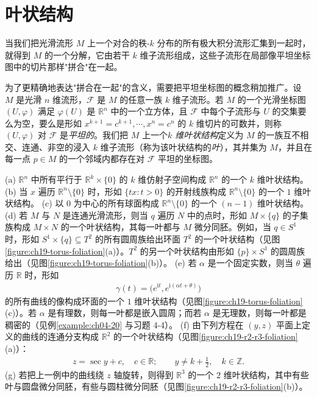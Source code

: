 \documentclass[../../main.tex]{subfiles}
\begin{document}
\section{叶状结构}\label{section:ch19-foliations}

当我们把光滑流形 $M$ 上一个对合的秩-$k$ 分布的所有极大积分流形汇集到一起时，就得到 $M$ 的一个分解，它由若干 $k$ 维子流形组成，这些子流形在局部像平坦坐标图中的切片那样"拼合"在一起。

为了更精确地表达"拼合在一起"的含义，需要把平坦坐标图的概念稍加推广。设 $M$ 是光滑 $n$ 维流形，$\mathscr F$ 是 $M$ 的任意一族 $k$ 维子流形。若 $M$ 的一个光滑坐标图 $(U,\varphi)$ 满足 $\varphi(U)$ 是 $\mathbb{R}^n$ 中的一个立方体，且 $\mathscr F$ 中每个子流形与 $U$ 的交集要么为空，要么是形如 $x^{k+1}=c^{k+1},\cdots ,x^n=c^n$ 的 $k$ 维切片的可数并，则称 $(U,\varphi)$ 对 $\mathscr F$ 是\emph{平坦的}。我们把 $M$ 上一个\emph{$k$ 维叶状结构}定义为 $M$ 的一族互不相交、连通、非空的浸入 $k$ 维子流形（称为该叶状结构的\emph{叶}），其并集为 $M$，并且在每一点 $p\in M$ 的一个邻域内都存在对 $\mathscr F$ 平坦的坐标图。

\begin{example}[叶状结构]\label{example:ch19-foliations}
(a) $\mathbb{R}^n$ 中所有平行于 $\mathbb{R}^k\times\{0\}$ 的 $k$ 维仿射子空间构成 $\mathbb{R}^n$ 的一个 $k$ 维叶状结构。
(b) 当 $x$ 遍历 $\mathbb{R}^n\setminus\{0\}$ 时，形如 $\{tx\colon t>0\}$ 的开射线族构成 $\mathbb{R}^n\setminus\{0\}$ 的一个 $1$ 维叶状结构。
(c) 以 $0$ 为中心的所有球面构成 $\mathbb{R}^n\setminus\{0\}$ 的一个 $(n-1)$ 维叶状结构。
(d) 若 $M$ 与 $N$ 是连通光滑流形，则当 $q$ 遍历 $N$ 中的点时，形如 $M\times\{q\}$ 的子集族构成 $M\times N$ 的一个叶状结构，其每一叶都与 $M$ 微分同胚。例如，当 $q\in S^1$ 时，形如 $S^1\times\{q\}\subseteq T^2$ 的所有圆周族给出环面 $T^2$ 的一个叶状结构（见图\cref{figure:ch19-torus-foliation}(a)）。$T^2$ 的另一个叶状结构由形如 $\{p\}\times S^1$ 的圆周族给出（见图\cref{figure:ch19-torus-foliation}(b)）。
(e) 若 $\alpha$ 是一个固定实数，则当 $\theta$ 遍历 $\mathbb{R}$ 时，形如
\begin{align*}
\gamma(t)=\bigl(e^{\mathrm{i}t},e^{\mathrm{i}(\alpha t+\theta)}\bigr)
\end{align*}
的所有曲线的像构成环面的一个 $1$ 维叶状结构（见图\cref{figure:ch19-torus-foliation}(c)）。若 $\alpha$ 是有理数，则每一叶都是嵌入圆周；而若 $\alpha$ 是无理数，则每一叶都是稠密的（见例\cref{example:ch04-20} 与习题 4-4）。
(f) 由下列方程在 $(y,z)$ 平面上定义的曲线的连通分支构成 $\mathbb{R}^2$ 的一个叶状结构（见图\cref{figure:ch19-r2-r3-foliation}(a)）：
\begin{align*}
z=\sec y+c,\quad c\in\mathbb{R};\qquad y\ne k+\tfrac12,\quad k\in\mathbb{Z}.
\end{align*}
(g) 若把上一例中的曲线绕 $z$ 轴旋转，则得到 $\mathbb{R}^3$ 的一个 $2$ 维叶状结构，其中有些叶与圆盘微分同胚，有些与圆柱微分同胚（见图\cref{figure:ch19-r2-r3-foliation}(b)）。
\end{example}
\end{document}

